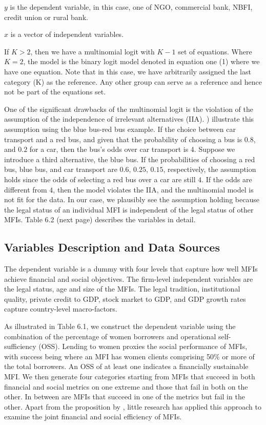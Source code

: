 \documentclass[a4paper, nobind]{templates/ociamthesis}
\begin{document}
\(y\) is the dependent variable, in this case, one of NGO, commercial bank, NBFI, credit union or rural bank.

\(x\) is a vector of independent variables.

If \(K>2\), then we have a multinomial logit with \(K-1\) set of equations. Where \(K=2\), the model is the binary logit model denoted in equation one (1) where we have one equation. Note that in this case, we have arbitrarily assigned the last category (K) as the reference. Any other group can serve as a reference and hence not be part of the equations set.

One of the significant drawbacks of the multinomial logit is the violation of the assumption of the independence of irrelevant alternatives (IIA). \textcite{cheng2007testing} ) illustrate this assumption using the blue bus-red bus example. If the choice between car transport and a red bus, and given that the probability of choosing a bus is \(0.8\), and \(0.2\) for a car, then the bus's odds over car transport is 4. Suppose we introduce a third alternative, the blue bus. If the probabilities of choosing a red bus, blue bus, and car transport are \(0.6\), \(0.25\), \(0.15\), respectively, the assumption holds since the odds of selecting a red bus over a car are still \(4\). If the odds are different from \(4\), then the model violates the IIA, and the multinomial model is not fit for the data. In our case, we plausibly see the assumption holding because the legal status of an individual MFI is independent of the legal status of other MFIs. Table 6.2 (next page) describes the variables in detail.

\hypertarget{variables-description-and-data-sources}{%
\subsection{Variables Description and Data Sources}\label{variables-description-and-data-sources}}

The dependent variable is a dummy with four levels that capture how well MFIs achieve financial and social objectives. The firm-level independent variables are the legal status, age and size of the MFIs. The legal tradition, institutional quality, private credit to GDP, stock market to GDP, and GDP growth rates capture country-level macro-factors.

As illustrated in Table 6.1, we construct the dependent variable using the combination of the percentage of women borrowers and operational self-sufficiency (OSS). Lending to women proxies the social performance of MFIs, with success being where an MFI has women clients comprising 50\% or more of the total borrowers. An OSS of at least one indicates a financially sustainable MFI. We then generate four categories starting from MFIs that succeed in both financial and social metrics on one extreme and those that fail in both on the other. In between are MFIs that succeed in one of the metrics but fail in the other. Apart from the proposition by \textcite{chattopadhyay2017applicability}, little research has applied this approach to examine the joint financial and social efficiency of MFIs.
\end{document}

